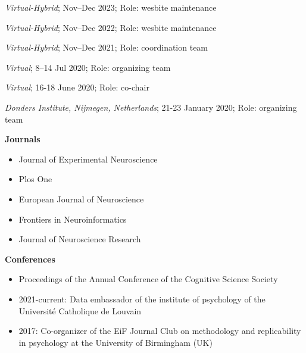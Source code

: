 
\textit{Virtual-Hybrid};
Nov--Dec 2023;
Role: wesbite maintenance

\textit{Virtual-Hybrid};
Nov--Dec 2022;
Role: wesbite maintenance

\textit{Virtual-Hybrid};
Nov--Dec 2021;
Role: coordination team

%
\textit{Virtual};
8--14 Jul 2020;
Role: organizing team

%
\textit{Virtual};
16-18 June 2020;
Role: co-chair

%
\textit{Donders Institute, Nijmegen, Netherlands};
21-23 January 2020;
Role: organizing team



\textbf{Journals}

\begin{itemize}
    \item Journal of Experimental Neuroscience
    \item Plos One
    \item European Journal of Neuroscience
    \item Frontiers in Neuroinformatics
    \item Journal of Neuroscience Research
\end{itemize}

\textbf{Conferences}

\begin{itemize}
    \item Proceedings of the Annual Conference of the Cognitive Science Society
\end{itemize}



\begin{itemize}
    \item 2021-current: Data embassador of the institute of psychology of the Université Catholique de Louvain
    \item 2017: Co-organizer of the EiF Journal Club on methodology and replicability in psychology at the University of Birmingham (UK)
\end{itemize}

